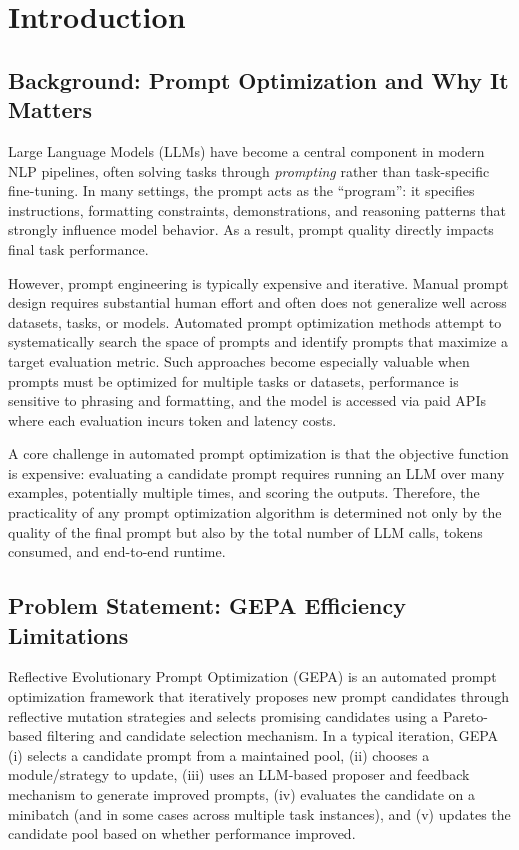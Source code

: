 \chapter{Introduction}

\section{Background: Prompt Optimization and Why It Matters}
Large Language Models (LLMs) have become a central component in modern NLP pipelines, often solving tasks through \emph{prompting} rather than task-specific fine-tuning. In many settings, the prompt acts as the ``program'': it specifies instructions, formatting constraints, demonstrations, and reasoning patterns that strongly influence model behavior. As a result, prompt quality directly impacts final task performance.

However, prompt engineering is typically expensive and iterative. Manual prompt design requires substantial human effort and often does not generalize well across datasets, tasks, or models. Automated prompt optimization methods attempt to systematically search the space of prompts and identify prompts that maximize a target evaluation metric. Such approaches become especially valuable when prompts must be optimized for multiple tasks or datasets, performance is sensitive to phrasing and formatting, and the model is accessed via paid APIs where each evaluation incurs token and latency costs.

A core challenge in automated prompt optimization is that the objective function is expensive: evaluating a candidate prompt requires running an LLM over many examples, potentially multiple times, and scoring the outputs. Therefore, the practicality of any prompt optimization algorithm is determined not only by the quality of the final prompt but also by the total number of LLM calls, tokens consumed, and end-to-end runtime.

\section{Problem Statement: GEPA Efficiency Limitations}
Reflective Evolutionary Prompt Optimization (GEPA) is an automated prompt optimization framework that iteratively proposes new prompt candidates through reflective mutation strategies and selects promising candidates using a Pareto-based filtering and candidate selection mechanism. In a typical iteration, GEPA (i) selects a candidate prompt from a maintained pool, (ii) chooses a module/strategy to update, (iii) uses an LLM-based proposer and feedback mechanism to generate improved prompts, (iv) evaluates the candidate on a minibatch (and in some cases across multiple task instances), and (v) updates the candidate pool based on whether performance improved.

